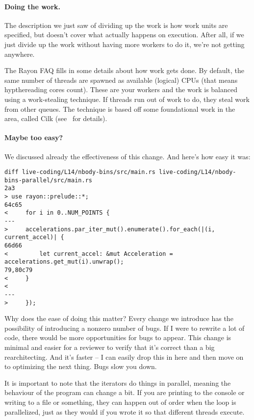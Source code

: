 \paragraph{Doing the work.} The description we just saw of dividing up the work is how work units are specified, but doesn't cover what actually happens on execution. After all, if we just divide up the work without having more workers to do it, we're not getting anywhere.

The Rayon FAQ fills in some details about how work gets done. By default, the same number of threads are spawned as available (logical) CPUs (that means hypthereading cores count). These are your workers and the work is balanced using a work-stealing technique. If threads run out of work to do, they steal work from other queues. The technique is based off some foundational work in the area, called Cilk (see~\cite{cilk} for details). 

\paragraph{Maybe too easy?}
We discussed already the effectiveness of this change. And here's how easy it was:

{\scriptsize 
\begin{verbatim}
diff live-coding/L14/nbody-bins/src/main.rs live-coding/L14/nbody-bins-parallel/src/main.rs
2a3
> use rayon::prelude::*;
64c65
<     for i in 0..NUM_POINTS {
---
>     accelerations.par_iter_mut().enumerate().for_each(|(i, current_accel)| {
66d66
<         let current_accel: &mut Acceleration = accelerations.get_mut(i).unwrap();
79,80c79
<     }
< 
---
>     });
\end{verbatim}
}

Why does the ease of doing this matter? Every change we introduce has the possibility of introducing a nonzero number of bugs. If I were to rewrite a lot of code, there would be more opportunities for bugs to appear. This change is minimal and easier for a reviewer to verify that it's correct than a big rearchitecting. And it's faster -- I can easily drop this in here and then move on to optimizing the next thing. Bugs slow you down.

It is important to note that the iterators do things in parallel, meaning the behaviour of the program can change a bit. If you are printing to the console or writing to a file or something, they can happen out of order when the loop is parallelized, just as they would if you wrote it so that different threads execute.

